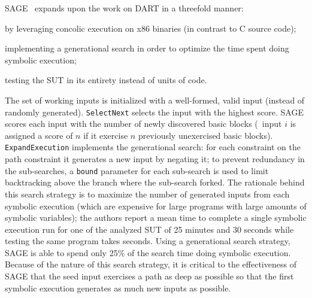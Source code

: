 SAGE~\cite{godefroid2008automated, godefroid2012sage} expands upon the work on
DART in a threefold manner:
\begin{enumeratein}
    \item by leveraging concolic execution on x86 binaries (in contrast to C
        source code);
    \item implementing a generational search in order to optimize the time spent
        doing symbolic execution;
    \item testing the \ac{SUT} in its entirety instead of units of code.
\end{enumeratein}
The set of working inputs is initialized with a well-formed, valid input
(instead of randomly generated). \texttt{SelectNext} selects the input with the
highest score. SAGE scores each input with the number of newly discovered basic
blocks (\eg~input $i$ is assigned a score of $n$ if it exercise $n$ previously
unexercised basic blocks). \texttt{ExpandExecution} implements the generational
search: for each constraint on the path constraint it generates a new input by
negating it; to prevent redundancy in the sub-searches, a \texttt{bound}
parameter for each sub-search is used to limit backtracking above the branch
where the sub-search forked. The rationale behind this search strategy is to
maximize the number of generated inputs from each symbolic execution (which are
expensive for large programs with large amounts of symbolic variables); the
authors report a mean time to complete a single symbolic execution run for one
of the analyzed \ac{SUT} of 25 minutes and 30 seconds while testing the same
program takes seconds. Using a generational search strategy, SAGE is able to
spend only 25\% of the search time doing symbolic execution. Because of the
nature of this search strategy, it is critical to the effectiveness of SAGE that
the seed input exercises a path as deep as possible so that the first symbolic
execution generates as much new inputs as possible.

